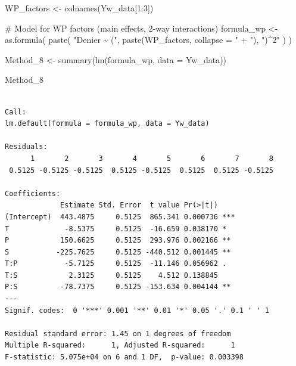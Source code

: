 \documentclass[
  letterpaper,
  DIV=11,
  numbers=noendperiod]{scrartcl}
\newenvironment{Shaded}{\begin{snugshade}}{\end{snugshade}}
\newcommand{\AttributeTok}[1]{\textcolor[rgb]{0.40,0.45,0.13}{#1}}
\newcommand{\CommentTok}[1]{\textcolor[rgb]{0.37,0.37,0.37}{#1}}
\newcommand{\DecValTok}[1]{\textcolor[rgb]{0.68,0.00,0.00}{#1}}
\newcommand{\FunctionTok}[1]{\textcolor[rgb]{0.28,0.35,0.67}{#1}}
\newcommand{\NormalTok}[1]{\textcolor[rgb]{0.00,0.23,0.31}{#1}}
\newcommand{\OtherTok}[1]{\textcolor[rgb]{0.00,0.23,0.31}{#1}}
\newcommand{\SpecialCharTok}[1]{\textcolor[rgb]{0.37,0.37,0.37}{#1}}
\newcommand{\StringTok}[1]{\textcolor[rgb]{0.13,0.47,0.30}{#1}}
\begin{document}
\begin{Shaded}
\begin{Highlighting}[]
\NormalTok{WP\_factors }\OtherTok{\textless{}{-}} \FunctionTok{colnames}\NormalTok{(Yw\_data[}\DecValTok{1}\SpecialCharTok{:}\DecValTok{3}\NormalTok{])}


\CommentTok{\# Model for WP factors (main effects, 2{-}way interactions)}
\NormalTok{formula\_wp }\OtherTok{\textless{}{-}} \FunctionTok{as.formula}\NormalTok{(}
  \FunctionTok{paste}\NormalTok{(}
    \StringTok{"Denier \textasciitilde{} ("}\NormalTok{,}
    \FunctionTok{paste}\NormalTok{(WP\_factors, }\AttributeTok{collapse =} \StringTok{" + "}\NormalTok{),}
    \StringTok{")\^{}2"}
\NormalTok{  )}
\NormalTok{)}

\NormalTok{Method\_8 }\OtherTok{\textless{}{-}} \FunctionTok{summary}\NormalTok{(}\FunctionTok{lm}\NormalTok{(formula\_wp, }\AttributeTok{data =}\NormalTok{ Yw\_data))}

\NormalTok{Method\_8}
\end{Highlighting}
\end{Shaded}

\begin{verbatim}

Call:
lm.default(formula = formula_wp, data = Yw_data)

Residuals:
      1       2       3       4       5       6       7       8 
 0.5125 -0.5125 -0.5125  0.5125 -0.5125  0.5125  0.5125 -0.5125 

Coefficients:
             Estimate Std. Error  t value Pr(>|t|)    
(Intercept)  443.4875     0.5125  865.341 0.000736 ***
T             -8.5375     0.5125  -16.659 0.038170 *  
P            150.6625     0.5125  293.976 0.002166 ** 
S           -225.7625     0.5125 -440.512 0.001445 ** 
T:P           -5.7125     0.5125  -11.146 0.056962 .  
T:S            2.3125     0.5125    4.512 0.138845    
P:S          -78.7375     0.5125 -153.634 0.004144 ** 
---
Signif. codes:  0 '***' 0.001 '**' 0.01 '*' 0.05 '.' 0.1 ' ' 1

Residual standard error: 1.45 on 1 degrees of freedom
Multiple R-squared:      1, Adjusted R-squared:      1 
F-statistic: 5.075e+04 on 6 and 1 DF,  p-value: 0.003398
\end{verbatim}
\end{document}
